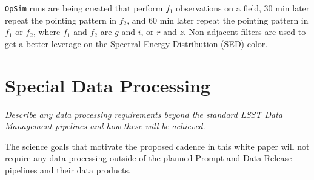 \documentclass[12pt, letterpaper]{article}
\begin{document}
{\tt OpSim} runs are being created that perform $f_1$ observations on a field, 30 min later repeat the pointing pattern in $f_2$, and 60 min later repeat the pointing pattern in $f_1$ or $f_2$, where $f_1$ and $f_2$ are $g$ and $i$, or $r$ and $z$. Non-adjacent filters are used to get a better leverage on the Spectral Energy Distribution (SED) color.

\vspace{.6in}

\clearpage
\section{Special Data Processing}
\begin{footnotesize}
{\it Describe any data processing requirements beyond the standard LSST Data Management pipelines and how these will be achieved.}
\end{footnotesize}

The science goals that motivate the proposed cadence in this white paper will not require any data processing outside of the planned Prompt and Data Release pipelines and their data products. 




\end{document}
